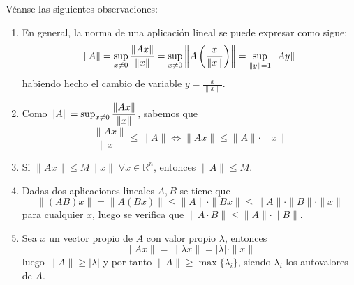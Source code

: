     \begin{obs}
        Véanse las siguientes observaciones:
        \begin{enumerate}
             \item En general, la norma de una aplicación lineal se puede expresar como sigue: 
            $$\|A\|=\sup_{x \neq 0} \dfrac{\|Ax\|}{\|x\|}=\sup_{x \neq 0} \left\|A\left(\frac{x}{\|x\|}\right)\right\|=\sup_{\|y\| =1} \|Ay\|\displaystyle$$ habiendo hecho el cambio de variable $y=\frac{x}{\|x\|}$.
            \item Como $\|A\|=\sup_{x \neq 0} \dfrac{\|Ax\|}{\|x\|} \displaystyle$, sabemos que
            $$\dfrac{\|Ax\|}{\|x\|}\leq \|A\|\Longleftrightarrow\|Ax\|\leq \|A\|\cdot \|x\|$$
            \item Si $\|Ax\|\leq M \|x\| \; \forall x \in \mathbb R^n$, entonces $\|A\|\leq M$.
            \item Dadas dos aplicaciones lineales $A,B$ se tiene que
            $$\|(AB)x\|=\|A(Bx)\|\leq \|A\|\cdot \|Bx\|\leq \|A\|\cdot\|B\|\cdot \|x\|$$
            para cualquier $x$, luego se verifica que
            $\|A\cdot B \| \leq \|A\|\cdot \|B\|$.
            \item Sea $x$ un vector propio de $A$ con valor propio $\lambda$, entonces
            $$\|Ax\|=\|\lambda x\|=|\lambda|\cdot \|x\|$$
            luego $\|A\|\geq |\lambda|$ y por tanto $\|A\|\geq \max\{\lambda_i\}$, siendo $\lambda_i$ los autovalores de $A$.    
        \end{enumerate}
    \end{obs}
